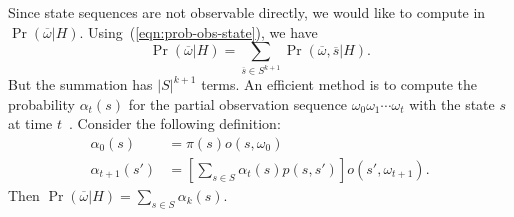 Since state sequences are not observable directly, we would like to
compute in $\Pr (\overline{\omega} |
H)$. Using~(\ref{eqn:prob-obs-state}), we have
\[
  \Pr (\overline{\omega} | H) = \sum_{\overline{s} \in S^{k+1}}
  \Pr (\overline{\omega}, \overline{s} | H).
\]
But the summation has $|S|^{k+1}$ terms. An efficient method is to
compute the probability $\alpha_t (s)$ for the partial observation
sequence $\omega_0\omega_1\cdots\omega_t$ with the state $s$ at time
$t$~\cite{R:89:ATHMM}. Consider the following definition:
\begin{align}
  \alpha_0 (s) &= \pi(s) o (s, \omega_0)
  \label{hmm:basis}
  \\
  \alpha_{t+1} (s') &= \left[
                      \sum_{s \in S} \alpha_t (s) p (s, s')
                      \right]
                      o (s', \omega_{t+1}).
  \label{hmm:inductive}
\end{align}
Then $\Pr (\overline{\omega} | H) = \sum_{s \in S} \alpha_k (s)$. 